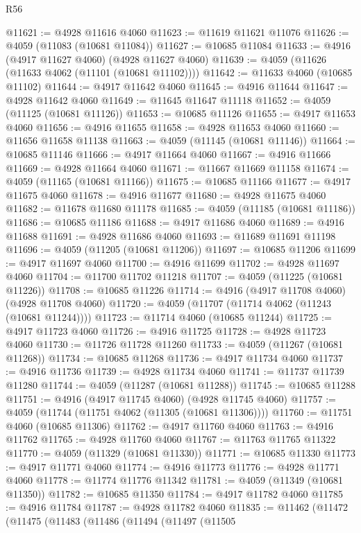 \begin{lexlean}{R56}
\begin{coremodule}
@11621 := @4928 @11616 @4060
@11623 := @11619 @11621 @11076
@11626 := @4059 (@11083 (@10681 @11084))
@11627 := @10685 @11084
@11633 := @4916 (@4917 @11627 @4060) (@4928 @11627 @4060)
@11639 := @4059 (@11626 (@11633 @4062 (@11101 (@10681 @11102))))
@11642 := @11633 @4060 (@10685 @11102)
@11644 := @4917 @11642 @4060
@11645 := @4916 @11644
@11647 := @4928 @11642 @4060
@11649 := @11645 @11647 @11118
@11652 := @4059 (@11125 (@10681 @11126))
@11653 := @10685 @11126
@11655 := @4917 @11653 @4060
@11656 := @4916 @11655
@11658 := @4928 @11653 @4060
@11660 := @11656 @11658 @11138
@11663 := @4059 (@11145 (@10681 @11146))
@11664 := @10685 @11146
@11666 := @4917 @11664 @4060
@11667 := @4916 @11666
@11669 := @4928 @11664 @4060
@11671 := @11667 @11669 @11158
@11674 := @4059 (@11165 (@10681 @11166))
@11675 := @10685 @11166
@11677 := @4917 @11675 @4060
@11678 := @4916 @11677
@11680 := @4928 @11675 @4060
@11682 := @11678 @11680 @11178
@11685 := @4059 (@11185 (@10681 @11186))
@11686 := @10685 @11186
@11688 := @4917 @11686 @4060
@11689 := @4916 @11688
@11691 := @4928 @11686 @4060
@11693 := @11689 @11691 @11198
@11696 := @4059 (@11205 (@10681 @11206))
@11697 := @10685 @11206
@11699 := @4917 @11697 @4060
@11700 := @4916 @11699
@11702 := @4928 @11697 @4060
@11704 := @11700 @11702 @11218
@11707 := @4059 (@11225 (@10681 @11226))
@11708 := @10685 @11226
@11714 := @4916 (@4917 @11708 @4060) (@4928 @11708 @4060)
@11720 := @4059 (@11707 (@11714 @4062 (@11243 (@10681 @11244))))
@11723 := @11714 @4060 (@10685 @11244)
@11725 := @4917 @11723 @4060
@11726 := @4916 @11725
@11728 := @4928 @11723 @4060
@11730 := @11726 @11728 @11260
@11733 := @4059 (@11267 (@10681 @11268))
@11734 := @10685 @11268
@11736 := @4917 @11734 @4060
@11737 := @4916 @11736
@11739 := @4928 @11734 @4060
@11741 := @11737 @11739 @11280
@11744 := @4059 (@11287 (@10681 @11288))
@11745 := @10685 @11288
@11751 := @4916 (@4917 @11745 @4060) (@4928 @11745 @4060)
@11757 := @4059 (@11744 (@11751 @4062 (@11305 (@10681 @11306))))
@11760 := @11751 @4060 (@10685 @11306)
@11762 := @4917 @11760 @4060
@11763 := @4916 @11762
@11765 := @4928 @11760 @4060
@11767 := @11763 @11765 @11322
@11770 := @4059 (@11329 (@10681 @11330))
@11771 := @10685 @11330
@11773 := @4917 @11771 @4060
@11774 := @4916 @11773
@11776 := @4928 @11771 @4060
@11778 := @11774 @11776 @11342
@11781 := @4059 (@11349 (@10681 @11350))
@11782 := @10685 @11350
@11784 := @4917 @11782 @4060
@11785 := @4916 @11784
@11787 := @4928 @11782 @4060
@11835 := @11462
    (@11472
      (@11475
        (@11483
          (@11486
            (@11494
              (@11497
                (@11505

\end{coremodule}
\end{lexlean}
